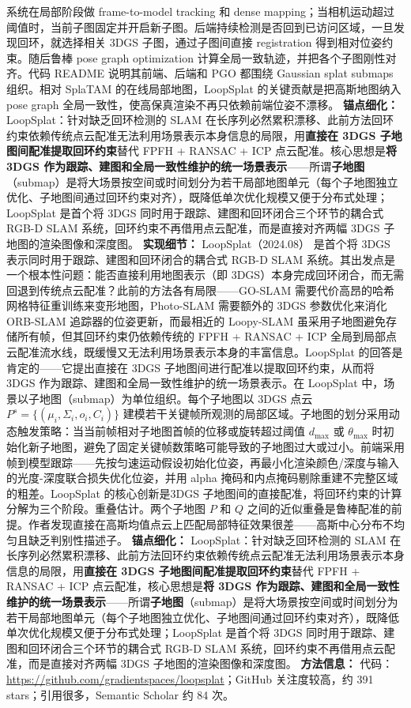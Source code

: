 系统在局部阶段做 frame-to-model tracking 和 dense mapping；当相机运动超过阈值时，当前子图固定并开启新子图。后端持续检测是否回到已访问区域，一旦发现回环，就选择相关 3DGS 子图，通过子图间直接 registration 得到相对位姿约束。随后鲁棒 pose graph optimization 计算全局一致轨迹，并把各个子图刚性对齐。代码 README 说明其前端、后端和 PGO 都围绕 Gaussian splat submaps 组织。相对 SplaTAM 的在线局部地图，LoopSplat 的关键贡献是把高斯地图纳入 pose graph 全局一致性，使高保真渲染不再只依赖前端位姿不漂移。
\textbf{锚点细化：} LoopSplat：针对缺乏回环检测的 SLAM 在长序列必然累积漂移、此前方法回环约束依赖传统点云配准无法利用场景表示本身信息的局限，用\textbf{直接在 3DGS 子地图间配准提取回环约束}替代 FPFH + RANSAC + ICP 点云配准。核心思想是\textbf{将 3DGS 作为跟踪、建图和全局一致性维护的统一场景表示}——所谓\textbf{子地图}（submap）是将大场景按空间或时间划分为若干局部地图单元（每个子地图独立优化、子地图间通过回环约束对齐），既降低单次优化规模又便于分布式处理；LoopSplat 是首个将 3DGS 同时用于跟踪、建图和回环闭合三个环节的耦合式 RGB-D SLAM 系统，回环约束不再借用点云配准，而是直接对齐两幅 3DGS 子地图的渲染图像和深度图。
\textbf{实现细节：} LoopSplat（2024.08） 是首个将 3DGS 表示同时用于跟踪、建图和回环闭合的耦合式 RGB-D SLAM 系统。其出发点是一个根本性问题：能否直接利用地图表示（即 3DGS）本身完成回环闭合，而无需回退到传统点云配准？此前的方法各有局限——GO-SLAM 需要代价高昂的哈希网格特征重训练来变形地图，Photo-SLAM 需要额外的 3DGS 参数优化来消化 ORB-SLAM 追踪器的位姿更新，而最相近的 Loopy-SLAM 虽采用子地图避免存储所有帧，但其回环约束仍依赖传统的 FPFH + RANSAC + ICP 全局到局部点云配准流水线，既缓慢又无法利用场景表示本身的丰富信息。LoopSplat 的回答是肯定的——它提出直接在 3DGS 子地图间进行配准以提取回环约束，从而将 3DGS 作为跟踪、建图和全局一致性维护的统一场景表示。在 LoopSplat 中，场景以子地图（submap）为单位组织。每个子地图以 3DGS 点云 $P^s = \{(\mu_i, \Sigma_i, o_i, C_i)\}$ 建模若干关键帧所观测的局部区域。子地图的划分采用动态触发策略：当当前帧相对子地图首帧的位移或旋转超过阈值 $d_{\max}$ 或 $\theta_{\max}$ 时初始化新子地图，避免了固定关键帧数策略可能导致的子地图过大或过小。前端采用帧到模型跟踪——先按匀速运动假设初始化位姿，再最小化渲染颜色/深度与输入的光度-深度联合损失优化位姿，并用 alpha 掩码和内点掩码剔除重建不完整区域的粗差。LoopSplat 的核心创新是3DGS 子地图间的直接配准，将回环约束的计算分解为三个阶段。重叠估计。两个子地图 $P$ 和 $Q$ 之间的近似重叠是鲁棒配准的前提。作者发现直接在高斯均值点云上匹配局部特征效果很差——高斯中心分布不均匀且缺乏判别性描述子。
\textbf{锚点细化：} LoopSplat：针对缺乏回环检测的 SLAM 在长序列必然累积漂移、此前方法回环约束依赖传统点云配准无法利用场景表示本身信息的局限，用\textbf{直接在 3DGS 子地图间配准提取回环约束}替代 FPFH + RANSAC + ICP 点云配准，核心思想是\textbf{将 3DGS 作为跟踪、建图和全局一致性维护的统一场景表示}——所谓\textbf{子地图}（submap）是将大场景按空间或时间划分为若干局部地图单元（每个子地图独立优化、子地图间通过回环约束对齐），既降低单次优化规模又便于分布式处理；LoopSplat 是首个将 3DGS 同时用于跟踪、建图和回环闭合三个环节的耦合式 RGB-D SLAM 系统，回环约束不再借用点云配准，而是直接对齐两幅 3DGS 子地图的渲染图像和深度图。
\textbf{方法信息：} 代码：\url{https://github.com/gradientspaces/loopsplat}；GitHub 关注度较高，约 391 stars；引用很多，Semantic Scholar 约 84 次。



